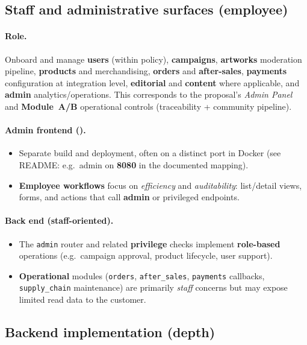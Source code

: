 \documentclass[11pt,a4paper]{article}
\begin{document}
\subsection{Staff and administrative surfaces (employee)}

\paragraph{Role.}
Onboard and manage \textbf{users} (within policy), \textbf{campaigns}, \textbf{artworks} moderation pipeline, \textbf{products} and merchandising, \textbf{orders} and \textbf{after-sales}, \textbf{payments} configuration at integration level, \textbf{editorial} and \textbf{content} where applicable, and \textbf{admin} analytics/operations. This corresponds to the proposal's \emph{Admin Panel} and \textbf{Module~A/B} operational controls (traceability + community pipeline).

\paragraph{Admin frontend ().}
\begin{itemize}
  \item Separate build and deployment, often on a distinct port in Docker (see  README: e.g.\ admin on \textbf{8080} in the documented mapping).
  \item \textbf{Employee workflows} focus on \emph{efficiency} and \emph{auditability}: list/detail views, forms, and actions that call \textbf{admin} or privileged endpoints.
\end{itemize}

\paragraph{Back end (staff-oriented).}
\begin{itemize}
  \item The \texttt{admin} router and related \textbf{privilege} checks implement \textbf{role-based} operations (e.g.\ campaign approval, product lifecycle, user support).
  \item \textbf{Operational} modules (\texttt{orders}, \texttt{after\_sales}, \texttt{payments} callbacks, \texttt{supply\_chain} maintenance) are primarily \emph{staff} concerns but may expose limited read data to the customer.
\end{itemize}

\subsection{Backend implementation (depth)}
\end{document}
